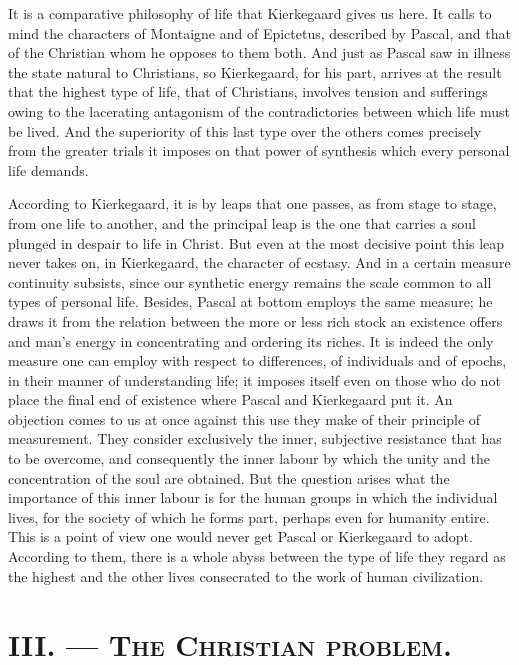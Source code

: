 \documentclass[12pt,a4paper]{article}
\newcommand{\opage}[1]{\marginnote{\footnotesize\textit{[#1]}}}
\begin{document}
It is a comparative philosophy of life that Kierkegaard gives us here. It calls
to mind the characters of Montaigne and of Epictetus,
described by Pascal, and that of the Christian whom he opposes to them both.
And just as Pascal saw in illness the state natural to Christians, so
Kierkegaard, for his part, arrives at the result that the highest type of life,
that of Christians, involves tension and sufferings owing to the lacerating
antagonism of the contradictories between which life must be lived. And the
superiority of this last type over the others comes precisely from the greater
trials it imposes on that power of synthesis which every personal life demands.

According to Kierkegaard, it is by leaps that one passes, as from stage to
stage, from one life to another, and the principal leap is the one that carries
a soul plunged in despair to life in Christ. But even at the most decisive
point this leap never takes on, in Kierkegaard, the character of ecstasy. And in
a certain measure continuity subsists, since our synthetic energy remains the
scale common to all types of personal life. Besides,
\opage{235}Pascal at bottom employs the same measure; he draws it from the relation between
the more or less rich stock an existence offers and man's energy in
concentrating and ordering its riches. It is indeed the only measure one can
employ with respect to differences, of individuals and of epochs, in their
manner of understanding life; it imposes itself even on those who do not place
the final end of existence where Pascal and Kierkegaard put it. An objection
comes to us at once against this use they make of their principle of
measurement. They consider exclusively the inner, subjective resistance that has
to be overcome, and consequently the inner labour by which the unity and the
concentration of the soul are obtained. But the question arises what the
importance of this inner labour is for the human groups in which the individual
lives, for the society of which he forms part, perhaps even for humanity
entire. This is a point of view one would never get Pascal or Kierkegaard to
adopt. According to them, there is a whole abyss between the type of life they
regard as the highest and the other lives consecrated to the work of human
civilization.

\section*{III. --- \textsc{The Christian problem.}}
\end{document}
